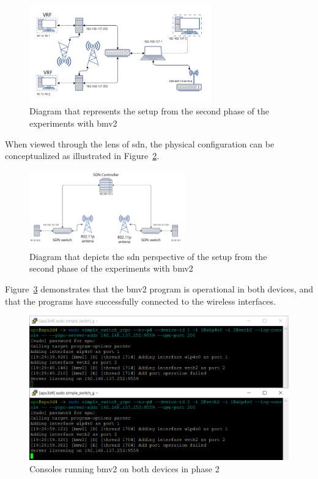 \begin{figure}
	\centering
	\includegraphics[width=0.7\textwidth]{Chapters/Figures/tests/bmv2_phase_2/setup_diagram.PNG}
	\caption{Diagram that represents the setup from the second phase of the experiments with \gls{bmv2}}
	\label{fig:exp2_phase2_diagram}
\end{figure}

When viewed through the lens of \gls{sdn}, the physical configuration can be conceptualized as illustrated in Figure~\ref{fig:exp2_phase2_sdn_diagram}.

\begin{figure}
	\centering
	\includegraphics[width=0.6\textwidth]{Chapters/Figures/tests/bmv2_phase_2/sdn_diagram.PNG}
	\caption{Diagram that depicts the \gls{sdn} perspective of the setup from the second phase of the experiments with \gls{bmv2}}
	\label{fig:exp2_phase2_sdn_diagram}
\end{figure}


Figure~\ref{fig:exp2_phase2_bmv2} demonstrates that the \gls{bmv2} program is operational in both devices, and that the programs have successfully connected to the wireless interfaces.

\begin{figure}
	\centering
	\includegraphics[width=\textwidth]{Chapters/Figures/tests/bmv2_phase_2/bmv2_running.PNG}
	\caption{Consoles running \gls{bmv2} on both devices in phase 2}
	\label{fig:exp2_phase2_bmv2}
\end{figure}


